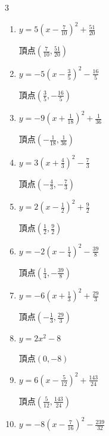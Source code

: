 \begin{multicols}{3}
\begin{enumerate}
        $\displaystyle 頂点\left( -\frac{1}{2} , -\frac{19}{4} \right)$

  \item $\displaystyle y=5\left( x-\frac{7}{10}\right)^{2}+\frac{51}{20}$

        $\displaystyle 頂点\left( \frac{7}{10} , \frac{51}{20} \right)$

  \item $\displaystyle y=-5\left( x-\frac{3}{5}\right)^{2}-\frac{16}{5}$

        $\displaystyle 頂点\left( \frac{3}{5} , -\frac{16}{5} \right)$

  \item $\displaystyle y=-9\left( x+\frac{1}{18}\right)^{2}+\frac{1}{36}$

        $\displaystyle 頂点\left( -\frac{1}{18} , \frac{1}{36} \right)$

  \item $\displaystyle y=3\left( x+\frac{4}{3}\right)^{2}-\frac{7}{3}$

        $\displaystyle 頂点\left( -\frac{4}{3} , -\frac{7}{3} \right)$

  \item $\displaystyle y=2\left( x-\frac{1}{2}\right)^{2}+\frac{9}{2}$

        $\displaystyle 頂点\left( \frac{1}{2} , \frac{9}{2} \right)$

  \item $\displaystyle y=-2\left( x-\frac{1}{4}\right)^{2}-\frac{39}{8}$

        $\displaystyle 頂点\left( \frac{1}{4} , -\frac{39}{8} \right)$

  \item $\displaystyle y=-6\left( x+\frac{1}{3}\right)^{2}+\frac{29}{3}$

        $\displaystyle 頂点\left( -\frac{1}{3} , \frac{29}{3} \right)$

\columnbreak %

  \item $\displaystyle y=2x^{2}-8$

        $\displaystyle 頂点\left( 0 , -8 \right)$

  \item $\displaystyle y=6\left( x-\frac{5}{12}\right)^{2}+\frac{143}{24}$

        $\displaystyle 頂点\left( \frac{5}{12} , \frac{143}{24} \right)$

  \item $\displaystyle y=-8\left( x-\frac{7}{16}\right)^{2}-\frac{239}{32}$


\end{enumerate}
\end{multicols}
